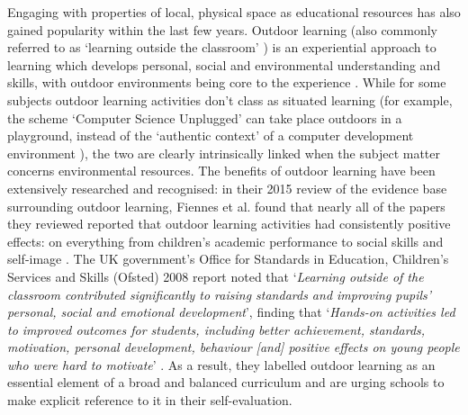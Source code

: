 Engaging with properties of local, physical space as educational resources has also gained popularity within the last few years. Outdoor learning (also commonly referred to as ‘learning outside the classroom’ \citep{Lotc.org2006}) is an experiential approach to learning which develops personal, social and environmental understanding and skills, with outdoor environments being core to the experience \citep{Harvey2012}. While for some subjects outdoor learning activities don't class as situated learning (for example, the scheme  `Computer Science Unplugged' can take place outdoors in a playground, instead of the `authentic context' of a computer development environment \citep{Bell2009}), the two are clearly intrinsically linked when the subject matter concerns environmental resources. The benefits of outdoor learning have been extensively researched and recognised: in their 2015 review of the evidence base surrounding outdoor learning, Fiennes et al. found that nearly all of the papers they reviewed reported that outdoor learning activities had consistently positive effects: on everything from children's academic performance to social skills and self-image \citep{Fiennes2015}. The UK government's Office for Standards in Education, Children's Services and Skills (Ofsted) 2008 report noted that `\textit{Learning outside of the classroom contributed significantly to raising standards and improving pupils’ personal, social and emotional development}', finding that `\textit{Hands-on activities led to improved outcomes for students, including better achievement, standards, motivation, personal development, behaviour [and] positive effects on young people who were hard to motivate}' \citep{Ofsted2008}. As a result, they labelled outdoor learning as an essential element of a broad and balanced curriculum and are urging schools to make explicit reference to it in their self-evaluation.

